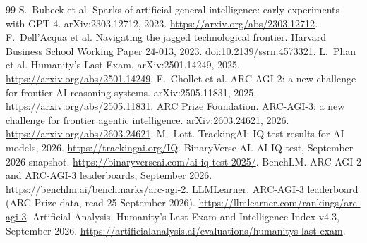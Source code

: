 \documentclass[11pt]{article}
\begin{document}
\begin{thebibliography}{99}
 S.~Bubeck et al. Sparks of artificial general intelligence: early experiments with GPT-4. arXiv:2303.12712, 2023. \url{https://arxiv.org/abs/2303.12712}.
 F.~Dell'Acqua et al. Navigating the jagged technological frontier. Harvard Business School Working Paper 24-013, 2023. \href{https://doi.org/10.2139/ssrn.4573321}{doi:10.2139/ssrn.4573321}.
 L.~Phan et al. Humanity's Last Exam. arXiv:2501.14249, 2025. \url{https://arxiv.org/abs/2501.14249}.
 F.~Chollet et al. ARC-AGI-2: a new challenge for frontier AI reasoning systems. arXiv:2505.11831, 2025. \url{https://arxiv.org/abs/2505.11831}.
 ARC Prize Foundation. ARC-AGI-3: a new challenge for frontier agentic intelligence. arXiv:2603.24621, 2026. \url{https://arxiv.org/abs/2603.24621}.
 M.~Lott. TrackingAI: IQ test results for AI models, 2026. \url{https://trackingai.org/IQ}.
 BinaryVerse AI. AI IQ test, September 2026 snapshot. \url{https://binaryverseai.com/ai-iq-test-2025/}.
 BenchLM. ARC-AGI-2 and ARC-AGI-3 leaderboards, September 2026. \url{https://benchlm.ai/benchmarks/arc-agi-2}.
 LLMLearner. ARC-AGI-3 leaderboard (ARC Prize data, read 25 September 2026). \url{https://llmlearner.com/rankings/arc-agi-3}.
 Artificial Analysis. Humanity's Last Exam and Intelligence Index v4.3, September 2026. \url{https://artificialanalysis.ai/evaluations/humanitys-last-exam}.
\end{thebibliography}
\end{document}
